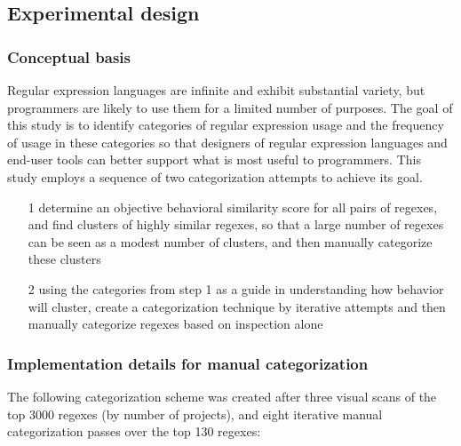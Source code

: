 \subsection{Experimental design}

\subsubsection{Conceptual basis}
Regular expression languages are infinite and exhibit substantial variety, but programmers are likely to use them for a limited number of purposes.  The goal of this study is to identify categories of regular expression usage and the frequency of usage in these categories so that designers of regular expression languages and end-user tools can better support what is most useful to programmers.  This study employs a sequence of two categorization attempts to achieve its goal.
\begin{itemize}\itemsep -1pt
\item[1] determine an objective behavioral similarity score for all pairs of regexes, and find clusters of highly similar regexes, so that a large number of regexes can be seen as a modest number of clusters, and then manually categorize these clusters
\item[2] using the categories from step 1 as a guide in understanding how behavior will cluster, create a categorization technique by iterative attempts and then manually categorize regexes based on inspection alone
\end{itemize}

\subsubsection{Implementation details for manual categorization}
The following categorization scheme was created after three visual scans of the top 3000 regexes (by number of projects), and eight iterative manual categorization passes over the top 130 regexes:

